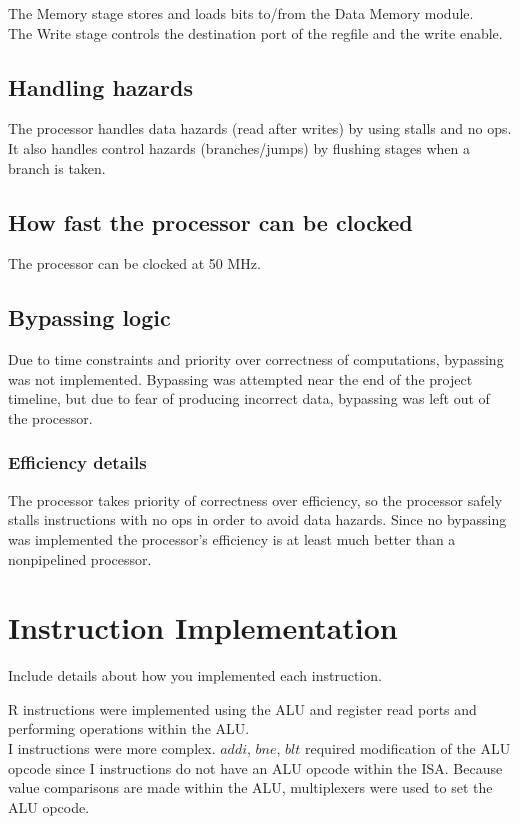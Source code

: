 \documentclass[a4paper,11pt]{article}
\begin{document}
The Memory stage stores and loads bits to/from the Data Memory module. \\

The Write stage controls the destination port of the regfile and the write enable.\\

\subsection*{Handling hazards}
The processor handles data hazards (read after writes) by using stalls and no ops. It also handles control hazards (branches/jumps) by flushing stages when a branch is taken.

\subsection*{How fast the processor can be clocked}
The processor can be clocked at 50 MHz.

\subsection*{Bypassing logic}
Due to time constraints and priority over correctness of computations, bypassing was not implemented. Bypassing was attempted near the end of the project timeline, but due to fear of producing incorrect data, bypassing was left out of the processor.

\subsubsection*{Efficiency details}
The processor takes priority of correctness over efficiency, so the processor safely stalls instructions with no ops in order to avoid data hazards. Since no bypassing was implemented the processor's efficiency is at least much better than a nonpipelined processor.

\newpage

\section{Instruction Implementation}
Include details about how you implemented each instruction.

R instructions were implemented using the ALU and register read ports and performing operations within the ALU. \\

I instructions were more complex. $addi$, $bne$, $blt$ required modification of the ALU opcode since I instructions do not have an ALU opcode within the ISA. Because value comparisons are made within the ALU, multiplexers were used to set the ALU opcode.
\end{document}
